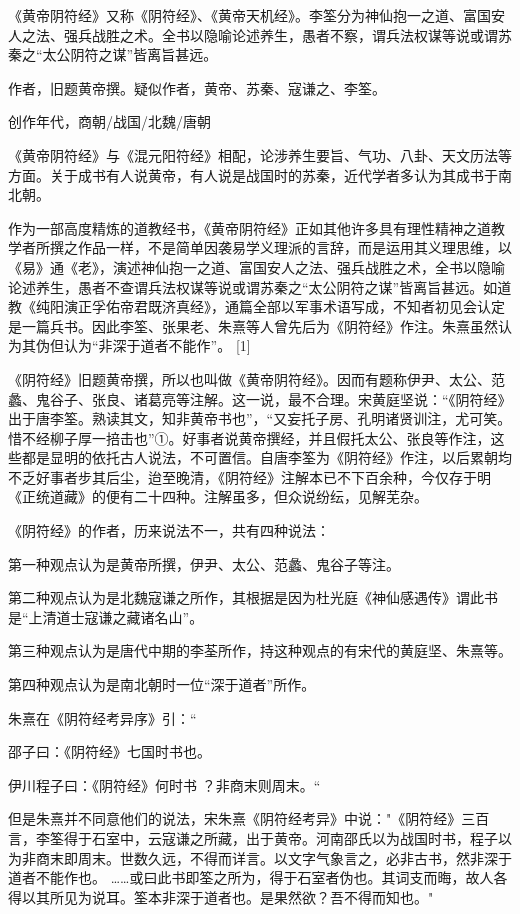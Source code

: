 \documentclass[12pt,UTF8]{ctexbook}
\begin{document}
《黄帝阴符经》又称《阴符经》、《黄帝天机经》。李筌分为神仙抱一之道、富国安人之法、强兵战胜之术。全书以隐喻论述养生，愚者不察，谓兵法权谋等说或谓苏秦之“太公阴符之谋”皆离旨甚远。

作者，旧题黄帝撰。疑似作者，黄帝、苏秦、寇谦之、李筌。

创作年代，商朝/战国/北魏/唐朝

《黄帝阴符经》与《混元阳符经》相配，论涉养生要旨、气功、八卦、天文历法等方面。关于成书有人说黄帝，有人说是战国时的苏秦，近代学者多认为其成书于南北朝。

作为一部高度精炼的道教经书，《黄帝阴符经》正如其他许多具有理性精神之道教学者所撰之作品一样，不是简单因袭易学义理派的言辞，而是运用其义理思维，以《易》通《老》，演述神仙抱一之道、富国安人之法、强兵战胜之术，全书以隐喻论述养生，愚者不查谓兵法权谋等说或谓苏秦之“太公阴符之谋”皆离旨甚远。如道教《纯阳演正孚佑帝君既济真经》，通篇全部以军事术语写成，不知者初见会认定是一篇兵书。因此李筌、张果老、朱熹等人曾先后为《阴符经》作注。朱熹虽然认为其伪但认为“非深于道者不能作”。 [1]

《阴符经》旧题黄帝撰，所以也叫做《黄帝阴符经》。因而有题称伊尹、太公、范蠡、鬼谷子、张良、诸葛亮等注解。这一说，最不合理。宋黄庭坚说：“《阴符经》出于唐李筌。熟读其文，知非黄帝书也”，“又妄托子房、孔明诸贤训注，尤可笑。惜不经柳子厚一掊击也”①。好事者说黄帝撰经，并且假托太公、张良等作注，这些都是显明的依托古人说法，不可置信。自唐李筌为《阴符经》作注，以后累朝均不乏好事者步其后尘，迨至晚清，《阴符经》注解本已不下百余种，今仅存于明《正统道藏》的便有二十四种。注解虽多，但众说纷纭，见解芜杂。

《阴符经》的作者，历来说法不一，共有四种说法：

第一种观点认为是黄帝所撰，伊尹、太公、范蠡、鬼谷子等注。

第二种观点认为是北魏寇谦之所作，其根据是因为杜光庭《神仙感遇传》谓此书是“上清道士寇谦之藏诸名山”。

第三种观点认为是唐代中期的李荃所作，持这种观点的有宋代的黄庭坚、朱熹等。

第四种观点认为是南北朝时一位“深于道者”所作。

朱熹在《阴符经考异序》引：“

邵子曰：《阴符经》七国时书也。

伊川程子曰：《阴符经》何时书 ？非商末则周末。“

但是朱熹并不同意他们的说法，宋朱熹《阴符经考异》中说："《阴符经》三百言，李筌得于石室中，云寇谦之所藏，出于黄帝。河南邵氏以为战国时书，程子以为非商末即周末。世数久远，不得而详言。以文字气象言之，必非古书，然非深于道者不能作也。 ……或曰此书即筌之所为，得于石室者伪也。其词支而晦，故人各得以其所见为说耳。筌本非深于道者也。是果然欲？吾不得而知也。"
\end{document}

